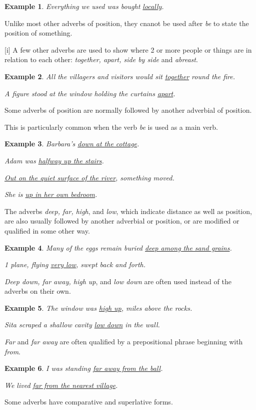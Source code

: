 \documentclass[oneside]{book}
\numberwithin{equation}{section}
\newtheorem{example}{Example}[section]
\begin{document}
\begin{example}
    Everything we used was bought \underline{locally}.
\end{example}
Unlike most other adverbs of position, they cnanot be used after \textit{be} to state the position of something.

%
\noindent{} [i] A few other adverbs are used to show where 2 or more people or things are in relation to each other: \textit{together, apart, side by side} and \textit{abreast}.
\begin{example}
    All the villagers and visitors would sit \underline{together} round the fire.
    
    A figure stood at the window holding the curtains \underline{apart}.
\end{example}
%
\noindent{} Some adverbs of position are normally followed by another adverbial of position.

This is particularly common when the verb \textit{be} is used as a main verb.
\begin{example}
    Barbara's \underline{down at the cottage}.
    
    Adam was \underline{halfway up the stairs}.
    
    \underline{Out on the quiet surface of the river}, something moved.
    
    She is \underline{up in her own bedroom}.
\end{example}
%
\noindent{} The adverbs \textit{deep, far, high}, and \textit{low}, which indicate distance as well as position, are also usually followed by another adverbial or position, or are modified or qualified in some other way.
\begin{example}
    Many of the eggs remain buried \underline{deep among the sand grains}.
    
    1 plane, flying \underline{very low}, swept back and forth.
\end{example}
\textit{Deep down, far away, high up}, and \textit{low down} are often used instead of the adverbs on their own.
\begin{example}
    The window was \underline{high up}, miles above the rocks.
    
    Sita scraped a shallow cavity \underline{low down} in the wall.
\end{example}
\textit{Far} and \textit{far away} are often qualified by a prepositional phrase beginning with \textit{from}.
\begin{example}
    I was standing \underline{far away from the ball}.
    
    We lived \underline{far from the nearest village}.
\end{example}
%
\noindent{} Some adverbs have comparative and superlative forms.
\end{document}
